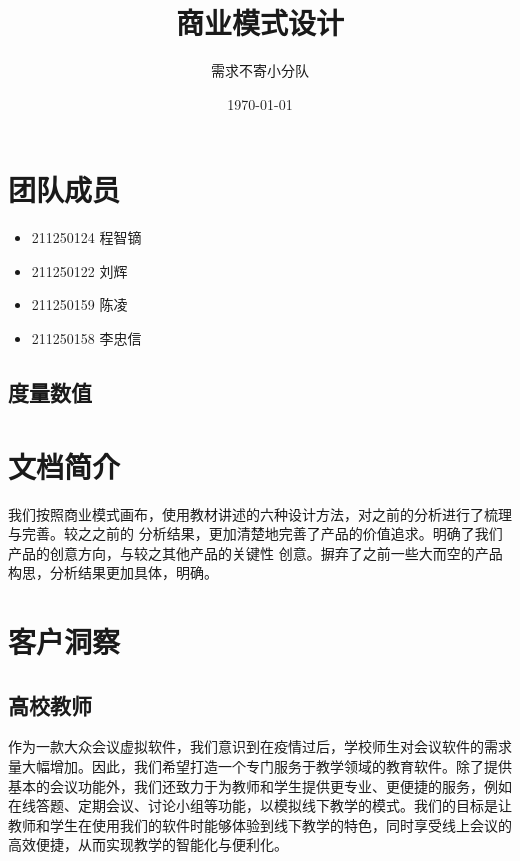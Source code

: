 \documentclass[a4paper,12pt]{article}
\title{商业模式设计}
\author{需求不寄小分队}
\date{\today}
\begin{document}
\maketitle

\tableofcontents

\section{团队成员}
\begin{itemize}
    \item 211250124 程智镝
    \item 211250122 刘辉
    \item 211250159 陈凌
    \item 211250158 李忠信
\end{itemize}

\subsection{度量数值}
    
\section{文档简介}
我们按照商业模式画布，使用教材讲述的六种设计方法，对之前的分析进行了梳理与完善。较之之前的
分析结果，更加清楚地完善了产品的价值追求。明确了我们产品的创意方向，与较之其他产品的关键性
创意。摒弃了之前一些大而空的产品构思，分析结果更加具体，明确。

\section{客户洞察}
\subsection{高校教师}
作为一款大众会议虚拟软件，我们意识到在疫情过后，学校师生对会议软件的需求量大幅增加。因此，我们希望打造一个专门服务于教学领域的教育软件。除了提供基本的会议功能外，我们还致力于为教师和学生提供更专业、更便捷的服务，例如在线答题、定期会议、讨论小组等功能，以模拟线下教学的模式。我们的目标是让教师和学生在使用我们的软件时能够体验到线下教学的特色，同时享受线上会议的高效便捷，从而实现教学的智能化与便利化。
\end{document}
